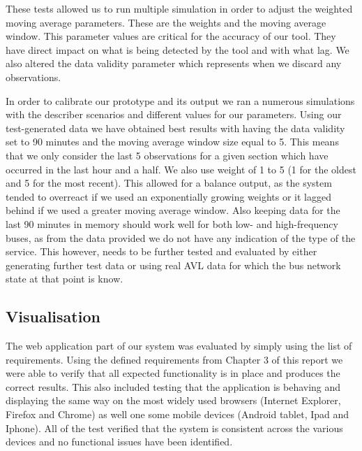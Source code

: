 These tests allowed us to run multiple simulation in order to adjust the weighted moving average parameters. These are the weights and the moving average window. This parameter values are critical for the accuracy of our tool. They have direct impact on what is being detected by the tool and with what lag. We also altered the data validity parameter which represents when we discard any observations.

In order to calibrate our prototype and its output we ran a numerous simulations with the describer scenarios and different values for our parameters. Using our test-generated data we have obtained best results with having the data validity set to 90 minutes and the moving average window size equal to 5. This means that we only consider the last 5 observations for a given section which have occurred in the last hour and a half. We also use weight of 1 to 5 (1 for the oldest and 5 for the most recent). This allowed for a balance output, as the system tended to overreact if we used an exponentially growing weights or it lagged behind if we used a greater moving average window. Also keeping data for the last 90 minutes in memory should work well for both low- and high-frequency buses, as from the data provided we do not have any indication of the type of the service. This however, needs to be further tested and evaluated by either generating further test data or using real AVL data for which the bus network state at that point is know.


\subsection{Visualisation}
The web application part of our system was evaluated by simply using the list of requirements. Using the defined requirements from Chapter 3 of this report we were able to verify that all expected functionality is in place and produces the correct results. This also included testing that the application is behaving and displaying the same way on the most widely used browsers (Internet Explorer, Firefox and Chrome) as well one some mobile devices (Android tablet, Ipad and Iphone). All of the test verified that the system is consistent across the various devices and no functional issues have been identified.

